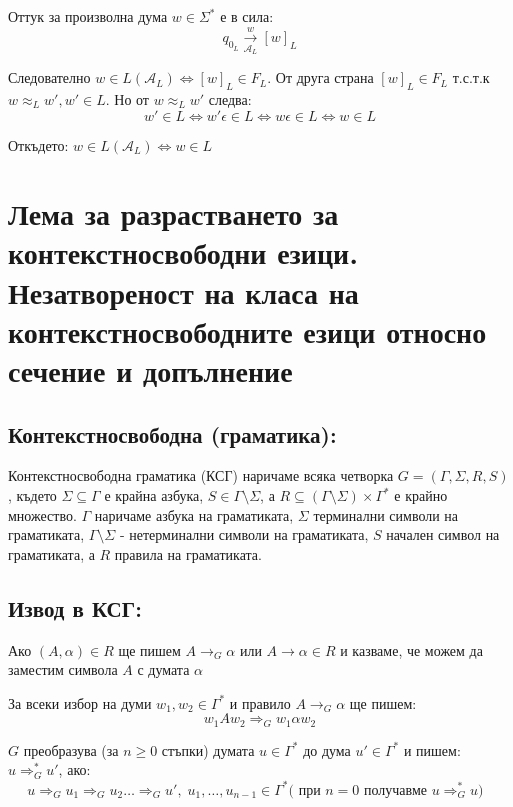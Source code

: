 \documentclass{article}
\renewcommand{\\}{\newline}
\begin{document}
    Оттук за произволна дума \(w \in \Sigma^{*}\) е в сила: \[
      q_{0_{L}} \overset{w}{\underset{\mathcal{A}_L}{\rightarrow}} [w]_{L}
    \]   

    Следователно \(w \in L(\mathcal{A}_L) \iff [w]_{L} \in F_{L}\). От друга страна \([w]_{L} \in F_{L}\) т.с.т.к \(w \approx_{L} w', w' \in L\). Но от \(w \approx_L w'\) следва: \[
      w' \in L \iff w'\epsilon \in L \iff w\epsilon \in L \iff w \in L
    \] 

    Откъдето: \(w \in L(\mathcal{A}_L) \iff w \in L\)  


\newpage
\section{Лема за разрастването за контекстносвободни езици. Незатвореност на класа на контекстносвободните езици относно сечение и допълнение}
  \subsection{Контекстносвободна (граматика): }      Контекстносвободна граматика (КСГ) наричаме всяка четворка \(G = \left(\Gamma, \Sigma, R, S\right)\), където \(\Sigma \subseteq \Gamma\) е крайна азбука, \(S \in \Gamma \setminus \Sigma\), а \(R \subseteq \left(\Gamma \setminus \Sigma\right)\times \Gamma^{*}\) е крайно множество. \(\Gamma\) наричаме азбука на граматиката, \(\Sigma\)  терминални символи на граматиката, \(\Gamma \setminus \Sigma\) - нетерминални символи на граматиката, \(S\) начален символ на граматиката, а \(R\) правила на граматиката.           

  \subsection{Извод в КСГ:} 
  Ако \(\left(A, \alpha\right) \in R\) ще пишем \(A \to_{G} \alpha\) или \(A \to \alpha \in R\) и казваме, че можем да заместим символа \(A\) с думата \(\alpha \)     

      За всеки избор на думи \(w_1, w_2 \in \Gamma^{*}\) и правило \(A \to_G \alpha\) ще пишем: \[
        w_1Aw_2 \Rightarrow_{G} w_1\alpha w_2
      \]    

      \(G\) преобразува (за \(n \geq 0\) стъпки) думата \(u \in \Gamma^{*}\) до дума \(u'\in \Gamma^{*}\) и пишем: \(u \Rightarrow^{*}_{G} u'\), ако: \[
        u \Rightarrow_{G} u_{1} \Rightarrow_{G} u_{2} \dots \Rightarrow_{G} u', \; u_{1},\dots, u_{n-1} \in \Gamma^{*} (\text{ при \(n=0\) получавме \(u \Rightarrow_{G}^{*} u)\)    } \]       
    
\end{document}
